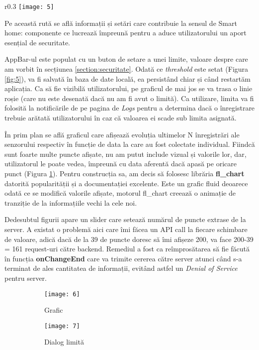 \begin{wrapfigure}{r}{0.3\textwidth}
	\texttt{[image: 5]}
	\caption{Date avansate despre senzorul 01}
	\label{fig:5}
\end{wrapfigure}

Pe această rută se află informații și setări care contribuie la sensul de Smart home: componente ce lucrează împreună pentru a aduce utilizatorului un aport esențial de securitate.

AppBar-ul este populat cu un buton de setare a unei limite, valoare despre care am vorbit în secțiunea \ref{section:securitate}. Odată ce \emph{threshold} este setat (Figura \ref{fig:5}), va fi salvată în baza de date locală, ea persistând chiar și când restartăm aplicația. Ca să fie vizibilă utilizatorului, pe graficul de mai jos se va trasa o linie roșie (care nu este desenată dacă nu am fi avut o limită). Ca utilizare, limita va fi folosită la notificările de pe pagina de \emph{Logs} pentru a determina dacă o înregistrare trebuie arătată utilizatorului în caz că valoarea ei scade sub limita asignată.

În prim plan se află graficul care afișează evoluția ultimelor N înregistrări ale senzorului respectiv în funcție de data la care au fost colectate individual. Fiindcă sunt foarte multe puncte afișate, nu am putut include vizual și valorile lor, dar, utilizatorul le poate vedea, împreună cu data aferentă dacă apasă pe oricare punct (Figura \ref{fig:6}). Pentru construcția sa, am decis să folosesc librăria \textbf{fl\_chart} datorită popularității și a documentației excelente. Este un grafic fluid deoarece odată ce se modifică valorile afișate, motorul fl\_chart creează o animație de tranziție de la informațiile vechi la cele noi.

Dedesubtul figurii apare un slider care setează numărul de puncte extrase de la server. A existat o problemă aici care îmi făcea un API call la fiecare schimbare de valoare, adică dacă de la 39 de puncte doresc să îmi afișeze 200, va face 200-39 = 161 request-uri către backend. Remediul a fost ca reîmprosătarea să fie făcută în funcția \textbf{onChangeEnd} care va trimite cererea către server atunci când s-a terminat de ales cantitatea de informații, evitând astfel un \emph{Denial of Service} pentru server.

\begin{figure}[h]
	\centering
	\begin{subfigure}{0.4\textwidth}
		\texttt{[image: 6]}
		\caption{Grafic}
		\label{fig:6}
	\end{subfigure}
	\hfill
	\begin{subfigure}{0.4\textwidth}
		\texttt{[image: 7]}
		\caption{Dialog limită}
		\label{fig:7}
	\end{subfigure}
	\caption{}
	\label{fig:all3}
\end{figure}

